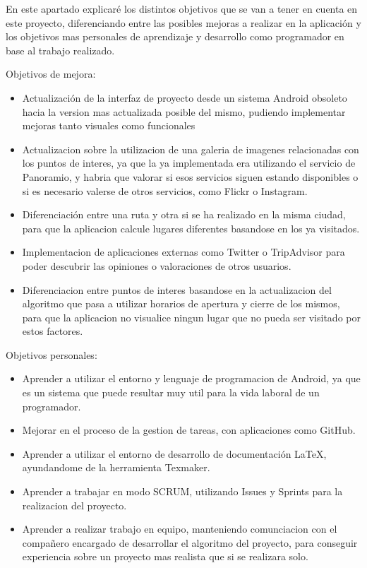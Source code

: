 
En este apartado explicaré los distintos objetivos que se van a tener en cuenta en este proyecto, diferenciando entre las posibles mejoras a realizar en la aplicación y los objetivos mas personales de aprendizaje y desarrollo como programador en base al trabajo realizado.

Objetivos de mejora:
\begin{itemize}
\item Actualización de la interfaz de proyecto desde un sistema Android obsoleto hacia la version mas actualizada posible del mismo, pudiendo implementar mejoras tanto visuales como funcionales
\item Actualizacion sobre la utilizacion de una galeria de imagenes relacionadas con los puntos de interes, ya que la ya implementada era utilizando el servicio de Panoramio, y habria que valorar si esos servicios siguen estando disponibles o si es necesario valerse de otros servicios, como Flickr o Instagram.
\item Diferenciación entre una ruta y otra si se ha realizado en la misma ciudad, para que la aplicacion calcule lugares diferentes basandose en los ya visitados.
\item Implementacion de aplicaciones externas como Twitter o TripAdvisor para poder descubrir las opiniones o valoraciones de otros usuarios.
\item Diferenciacion entre puntos de interes basandose en la actualizacion del algoritmo que pasa a utilizar horarios de apertura y cierre de los mismos, para que la aplicacion no visualice ningun lugar que no pueda ser visitado por estos factores.
\end{itemize}

Objetivos personales:
\begin{itemize}
\item Aprender a utilizar el entorno y lenguaje de programacion de Android, ya que es un sistema que puede resultar muy util para la vida laboral de un programador.
\item Mejorar en el proceso de la gestion de tareas, con aplicaciones como GitHub.
\item Aprender a utilizar el entorno de desarrollo de documentación LaTeX, ayundandome de la herramienta Texmaker.
\item Aprender a trabajar en modo SCRUM, utilizando Issues y Sprints para la realizacion del proyecto.
\item Aprender a realizar trabajo en equipo, manteniendo comunciacion con el compañero encargado de desarrollar el algoritmo del proyecto, para conseguir experiencia sobre un proyecto mas realista que si se realizara solo.
\end{itemize}

